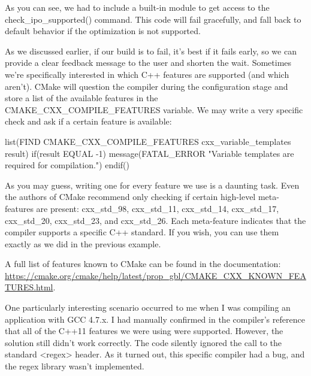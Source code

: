
As you can see, we had to include a built-in module to get access to the check\_ipo\_supported() command. This code will fail gracefully, and fall back to default behavior if the optimization is not supported.


As we discussed earlier, if our build is to fail, it’s best if it fails early, so we can provide a clear feedback message to the user and shorten the wait. Sometimes we’re specifically interested in which C++ features are supported (and which aren’t). CMake will question the compiler during the configuration stage and store a list of the available features in the CMAKE\_CXX\_COMPILE\_FEATURES variable. We may write a very specific check and ask if a certain feature is available:


\begin{cmake}
list(FIND CMAKE_CXX_COMPILE_FEATURES cxx_variable_templates result)
if(result EQUAL -1)
    message(FATAL_ERROR "Variable templates are required for compilation.")
endif()
\end{cmake}

As you may guess, writing one for every feature we use is a daunting task. Even the authors of CMake recommend only checking if certain high-level meta-features are present: cxx\_std\_98, cxx\_std\_11, cxx\_std\_14, cxx\_std\_17, cxx\_std\_20, cxx\_std\_23, and cxx\_std\_26. Each meta-feature indicates that the compiler supports a specific C++ standard. If you wish, you can use them exactly as we did in the previous example.

A full list of features known to CMake can be found in the documentation: \url{https://cmake.org/cmake/help/latest/prop_gbl/CMAKE_CXX_KNOWN_FEATURES.html}.


One particularly interesting scenario occurred to me when I was compiling an application with GCC 4.7.x. I had manually confirmed in the compiler’s reference that all of the C++11 features we were using were supported. However, the solution still didn’t work correctly. The code silently ignored the call to the standard <regex> header. As it turned out, this specific compiler had a bug, and the regex library wasn’t implemented.

